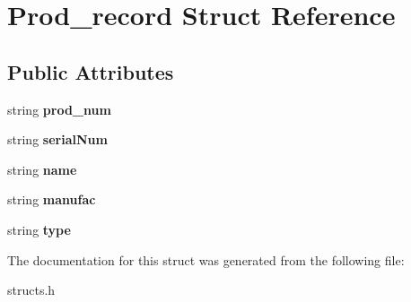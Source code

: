 \hypertarget{struct_prod__record}{}\section{Prod\+\_\+record Struct Reference}
\label{struct_prod__record}
\subsection*{Public Attributes}
\begin{DoxyCompactItemize}
\item 
\mbox{\label{struct_prod__record_aed161164f413870a3d9a12f63e7470d4}} 
string {\bfseries prod\+\_\+num}
\item 
\mbox{\label{struct_prod__record_a0a26916a24162167281ac6884e085c74}} 
string {\bfseries serial\+Num}
\item 
\mbox{\label{struct_prod__record_ada4dac6a5e5b1acd93c450ad995fcf6a}} 
string {\bfseries name}
\item 
\mbox{\label{struct_prod__record_a041ca45c285fd25286f08f81f5772f13}} 
string {\bfseries manufac}
\item 
\mbox{\label{struct_prod__record_a8de9d07326cd1094097081d666b9b45e}} 
string {\bfseries type}
\end{DoxyCompactItemize}


The documentation for this struct was generated from the following file\+:\begin{DoxyCompactItemize}
\item 
structs.\+h\end{DoxyCompactItemize}
